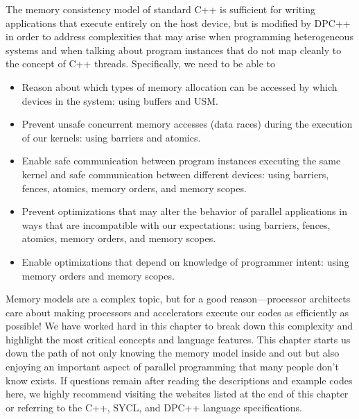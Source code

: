The memory consistency model of standard C++ is sufficient for writing applications that execute entirely on the host device, but is modified by DPC++ in order to address complexities that may arise when programming heterogeneous systems and when talking about program instances that do not map cleanly to the concept of C++ threads. Specifically, we need to be able to\par

\begin{itemize}
	\item Reason about which types of memory allocation can be accessed by which devices in the system: using buffers and USM.
	\item Prevent unsafe concurrent memory accesses (data races) during the execution of our kernels: using barriers and atomics.
	\item Enable safe communication between program instances executing the same kernel and safe communication between different devices: using barriers, fences, atomics, memory orders, and memory scopes.
	\item Prevent optimizations that may alter the behavior of parallel applications in ways that are incompatible with our expectations: using barriers, fences, atomics, memory orders, and memory scopes.
	\item Enable optimizations that depend on knowledge of programmer intent: using memory orders and memory scopes.
\end{itemize}

Memory models are a complex topic, but for a good reason—processor architects care about making processors and accelerators execute our codes as efficiently as possible! We have worked hard in this chapter to break down this complexity and highlight the most critical concepts and language features. This chapter starts us down the path of not only knowing the memory model inside and out but also enjoying an important aspect of parallel programming that many people don’t know exists. If questions remain after reading the descriptions and example codes here, we highly recommend visiting the websites listed at the end of this chapter or referring to the C++, SYCL, and DPC++ language specifications.\par














































